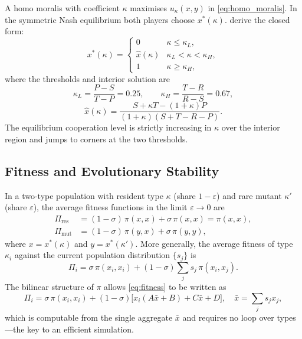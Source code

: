 \documentclass[12pt]{article}
\begin{document}
A homo moralis with coefficient $\kappa$ maximises $u_\kappa(x,y)$ in
\eqref{eq:homo_moralis}. In the symmetric Nash equilibrium both players choose
$x^*(\kappa)$. \citet{AlgerWeibull2013} derive the closed form:
\begin{equation}
    x^*(\kappa) = \begin{cases}
        0            & \kappa \leq \kappa_L, \\
        \hat{x}(\kappa) & \kappa_L < \kappa < \kappa_H, \\
        1            & \kappa \geq \kappa_H,
    \end{cases}
    \label{eq:xstar}
\end{equation}
where the thresholds and interior solution are
\begin{equation}
    \kappa_L = \frac{P-S}{T-P} = 0.25, \qquad
    \kappa_H = \frac{T-R}{R-S} = 0.67,
\end{equation}
\begin{equation}
    \hat{x}(\kappa)
    = \frac{S + \kappa T - (1+\kappa)P}{(1+\kappa)(S+T-R-P)}.
\end{equation}
The equilibrium cooperation level is strictly increasing in $\kappa$ over the
interior region and jumps to corners at the two thresholds.

\subsection{Fitness and Evolutionary Stability}

In a two-type population with resident type $\kappa$ (share $1-\varepsilon$)
and rare mutant $\kappa'$ (share $\varepsilon$), the average fitness functions
in the limit $\varepsilon \to 0$ are
\begin{align}
    \Pi_{\text{res}} &= (1-\sigma)\,\pi(x,x) + \sigma\,\pi(x,x) = \pi(x,x), \\
    \Pi_{\text{mut}} &= (1-\sigma)\,\pi(y,x) + \sigma\,\pi(y,y),
\end{align}
where $x = x^*(\kappa)$ and $y = x^*(\kappa')$. More generally, the average
fitness of type $\kappa_i$ against the current population distribution
$\{s_j\}$ is
\begin{equation}
    \Pi_i = \sigma\,\pi(x_i,x_i)
            + (1-\sigma)\sum_j s_j\,\pi(x_i,x_j).
    \label{eq:fitness}
\end{equation}
The bilinear structure of $\pi$ allows \eqref{eq:fitness} to be written as
\begin{equation}
    \Pi_i = \sigma\,\pi(x_i,x_i)
            + (1-\sigma)\bigl[x_i(A\bar{x}+B) + C\bar{x} + D\bigr],
    \quad \bar{x} = \sum_j s_j x_j,
\end{equation}
which is computable from the single aggregate $\bar{x}$ and requires no loop
over types---the key to an efficient simulation.
\end{document}
